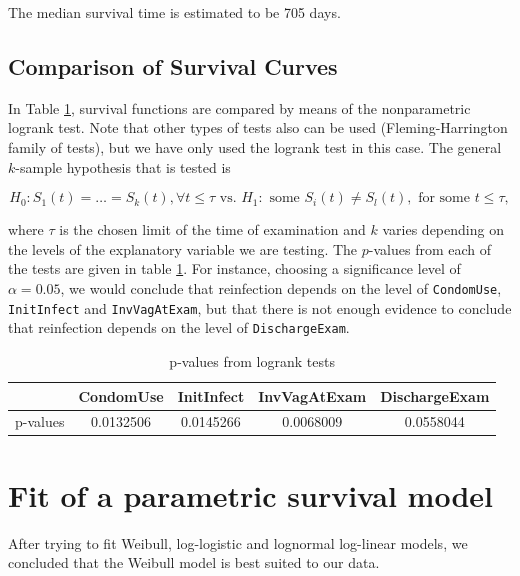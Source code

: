 \documentclass[
]{article}
\begin{document}
The median survival time is estimated to be 705 days.

\hypertarget{comparison-of-survival-curves}{%
\subsection{Comparison of Survival Curves}\label{comparison-of-survival-curves}}

In Table \ref{tab:pvalues}, survival functions are compared by means of the nonparametric logrank test. Note that other types of tests also can be used (Fleming-Harrington family of tests), but we have only used the logrank test in this case. The general \(k\)-sample hypothesis that is tested is

\begin{equation*}
        H_0: S_1(t) = \ldots = S_k(t), \forall t \leq \tau \text{ vs. } H_1: \text{ some } S_i(t) \neq S_l(t), \text{ for some } t \leq \tau,
\end{equation*}

where \(\tau\) is the chosen limit of the time of examination and \(k\) varies depending on the levels of the explanatory variable we are testing. The \(p\)-values from each of the tests are given in table \ref{tab:pvalues}. For instance, choosing a significance level of \(\alpha = 0.05\), we would conclude that reinfection depends on the level of \texttt{CondomUse}, \texttt{InitInfect} and \texttt{InvVagAtExam}, but that there is not enough evidence to conclude that reinfection depends on the level of \texttt{DischargeExam}.

\begin{table}

\caption{\label{tab:pvalues}p-values from logrank tests}
\centering
\begin{tabular}[t]{l|c|c|c|c}
\hline
  & CondomUse & InitInfect & InvVagAtExam & DischargeExam\\
\hline
p-values & 0.0132506 & 0.0145266 & 0.0068009 & 0.0558044\\
\hline
\end{tabular}
\end{table}

\hypertarget{fit-of-a-parametric-survival-model}{%
\section{Fit of a parametric survival model}\label{fit-of-a-parametric-survival-model}}

After trying to fit Weibull, log-logistic and lognormal log-linear models, we concluded that the Weibull model is best suited to our data.
\end{document}
